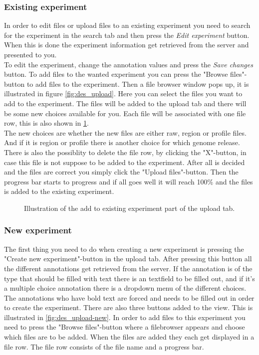 \subsubsection{Existing experiment}
\label{sec:des_exists}
In order to edit files or upload files to an existing experiment you need to search for the experiment in the search tab and then press the \emph{Edit experiment} button. When this is done the experiment information get retrieved from the server and presented to you. \\

To edit the experiment, change the annotation values and press the \emph{Save changes} button. To add files to the wanted experiment you can press the "Browse files"-button to add files to the experiment. Then a file browser window pops up, it is illustrated in figure \ref{fig:des_upload}. Here you can select the files you want to add to the experiment. The files will be added to the upload tab and there will be some new choices available for you. Each file  will be associated with one file row, this is also shown in \ref{fig:des_upload-exists}. \\

The new choices are whether the new files are either raw, region or profile files. And if it is region or profile there is another choice for which genome release. There is also the possiblity to delete the file row, by clicking the "X"-button, in case this file is not suppose to be added to the experiment. After all is decided and the files are correct you simply click the "Upload files"-button. Then the progress bar starts to progress and if all goes well it will reach 100\% and the files is added to the existing experiment.

\begin{figure}[h!]
	\caption{Illustration of the add to existing experiment part of the upload tab.}
	\label{fig:des_upload-exists}
\end{figure}
\newpage
\subsubsection{New experiment}
\label{sec:des_create}
The first thing you need to do when creating a new experiment is pressing the "Create new experiment"-button in the upload tab. After pressing this button all the different annotations get retrieved from the server. If the annotation is of the type that should be filled with text there is an textfield to be filled out, and if it's a multiple choice annotation there is a dropdown menu of the different choices. The annotations who have bold text are forced and needs to be filled out in order to create the experiment. There are also three buttons added to the view. This is illustrated in \ref{fig:des_upload-new}. In order to add files to this experiment you need to press the "Browse files"-button where a filebrowser appears and choose which files are to be added. When the files are added they each get displayed in a file row. The file row consists of the file name and a progress bar. \\

